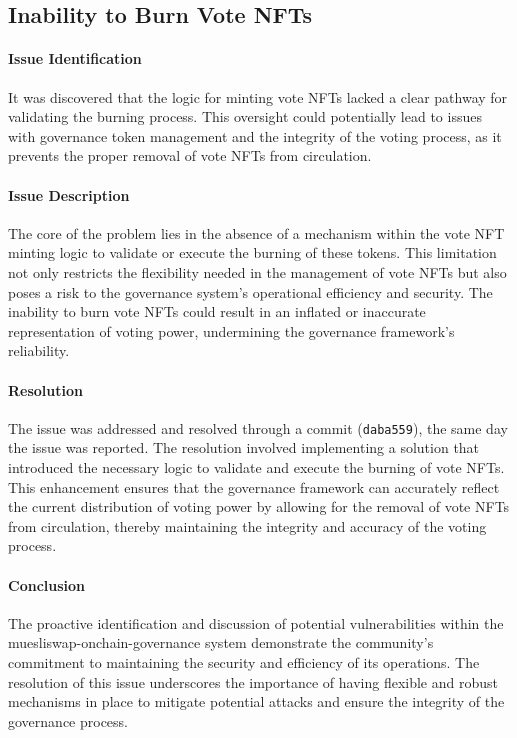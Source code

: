 \documentclass[11pt]{article}
\begin{document}
\subsection{Inability to Burn Vote NFTs}

\paragraph{Issue Identification}
It was discovered that the logic for minting vote NFTs lacked a clear pathway for validating the burning process.
This oversight could potentially lead to issues with governance token management and the integrity of the voting process, as it prevents the proper removal of vote NFTs from circulation.

\paragraph{Issue Description}
The core of the problem lies in the absence of a mechanism within the vote NFT minting logic to validate or execute the burning of these tokens.
This limitation not only restricts the flexibility needed in the management of vote NFTs but also poses a risk to the governance system's operational efficiency and security.
The inability to burn vote NFTs could result in an inflated or inaccurate representation of voting power, undermining the governance framework's reliability.

\paragraph{Resolution}
The issue was addressed and resolved through a commit (\texttt{daba559}), the same day the issue was reported.
The resolution involved implementing a solution that introduced the necessary logic to validate and execute the burning of vote NFTs. This enhancement ensures that the governance framework can accurately reflect the current distribution of voting power by allowing for the removal of vote NFTs from circulation, thereby maintaining the integrity and accuracy of the voting process.


\paragraph{Conclusion}
The proactive identification and discussion of potential vulnerabilities within the muesliswap-onchain-governance system demonstrate the community's commitment to maintaining the security and efficiency of its operations. The resolution of this issue underscores the importance of having flexible and robust mechanisms in place to mitigate potential attacks and ensure the integrity of the governance process.
\end{document}
